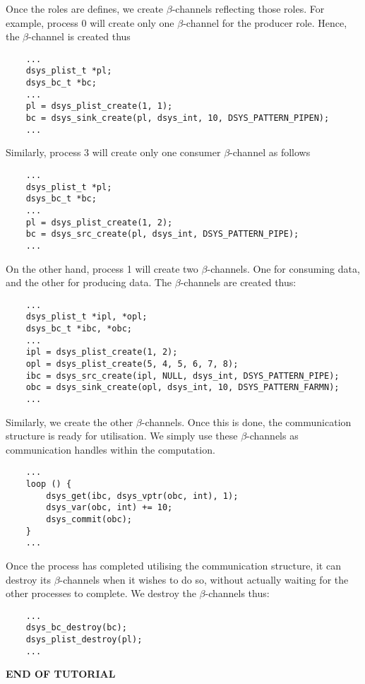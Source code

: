 \documentclass[a4paper,11pt]{amsart}
\begin{document}
Once the roles are defines, we create $\beta$-channels reflecting
those roles. For example, process 0 will create only one
$\beta$-channel for the producer role. Hence, the $\beta$-channel is
created thus

\begin{verbatim}
    ...
    dsys_plist_t *pl;
    dsys_bc_t *bc;
    ...
    pl = dsys_plist_create(1, 1);
    bc = dsys_sink_create(pl, dsys_int, 10, DSYS_PATTERN_PIPEN);
    ...
\end{verbatim}

Similarly, process 3 will create only one consumer $\beta$-channel as
follows

\begin{verbatim}
    ...
    dsys_plist_t *pl;
    dsys_bc_t *bc;
    ...
    pl = dsys_plist_create(1, 2);
    bc = dsys_src_create(pl, dsys_int, DSYS_PATTERN_PIPE);
    ...
\end{verbatim}

On the other hand, process 1 will create two $\beta$-channels. One for
consuming data, and the other for producing data. The $\beta$-channels
are created thus:

\begin{verbatim}
    ...
    dsys_plist_t *ipl, *opl;
    dsys_bc_t *ibc, *obc;
    ...
    ipl = dsys_plist_create(1, 2);
    opl = dsys_plist_create(5, 4, 5, 6, 7, 8);
    ibc = dsys_src_create(ipl, NULL, dsys_int, DSYS_PATTERN_PIPE);
    obc = dsys_sink_create(opl, dsys_int, 10, DSYS_PATTERN_FARMN);
    ...
\end{verbatim}

Similarly, we create the other $\beta$-channels. Once this is done,
the communication structure is ready for utilisation. We simply use
these $\beta$-channels as communication handles within the
computation.

\begin{verbatim}
    ...
    loop () {
        dsys_get(ibc, dsys_vptr(obc, int), 1);
        dsys_var(obc, int) += 10;
        dsys_commit(obc);
    }
    ...
\end{verbatim}


Once the process has completed utilising the
communication structure, it can destroy its $\beta$-channels when it
wishes to do so, without actually waiting for the other processes to
complete. We destroy the $\beta$-channels thus:

\begin{verbatim}
    ...
    dsys_bc_destroy(bc);
    dsys_plist_destroy(pl);
    ...
\end{verbatim}

\begin{center}
\textbf{END OF TUTORIAL}
\end{center}
\end{document}
